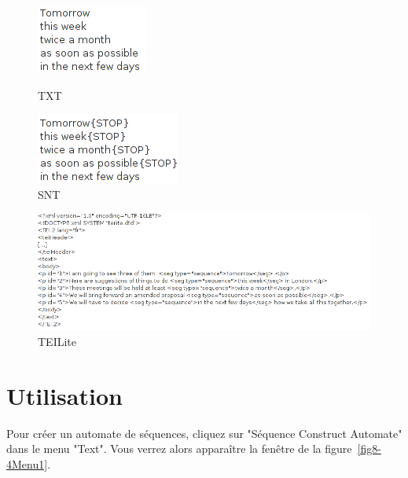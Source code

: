 \begin{figure}[h!]
	\begin{minipage}[h!]{0.5\linewidth}
		\centering
		\includegraphics[scale=0.6]{resources/img/fig8-1tomorrow.png}	
		\caption{TXT\label{fig8-1CorpusTxt}}
		\label{fig7-TXT}
	\end{minipage}
	\hspace{0.1cm}
	\begin{minipage}[h!]{0.5\linewidth}
		\centering
		\includegraphics[scale=0.6]{resources/img/fig8-2tomorrowSNT.png}
		\caption{SNT\label{fig8-2CorpusSNT}}
	\end{minipage}
	\hspace{0.1cm}
\end{figure}
\begin{figure}[h!]
	\begin{minipage}[h!]{\linewidth}
		\centering
			\includegraphics[width=14cm]{resources/img/fig8-3tomorrowTEI.png}
			\caption{TEILite\label{fig8-3CorpusTEI}}
	\end{minipage}
\end{figure}


\section{Utilisation}
Pour créer un automate de séquences, cliquez sur "Séquence Construct Automate" dans le menu "Text".
Vous verrez alors apparaître la fenêtre de la figure~\ref{fig8-4Menu1}.

